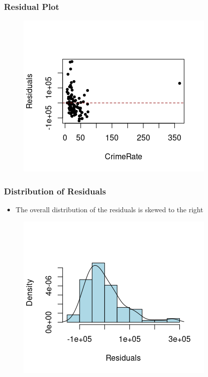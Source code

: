 \documentclass[10pt]{beamer}
\theoremstyle{plain}
\begin{document}
\begin{frame}
\frametitle{\sc Residual Plot}
    \begin{figure}[!ht]
		\centering
		\includegraphics[scale=0.9]{figs8/residual.png}
	\end{figure}
\end{frame}

\begin{frame}
	\frametitle{\sc Distribution of Residuals}
	\begin{itemize}
		\item The overall distribution of the residuals is skewed to the right
    \end{itemize}	
    \begin{figure}[!ht]
		\centering
		\includegraphics[scale=0.8]{figs8/residuals-density.png}
	\end{figure}	
\end{frame}
\end{document}
